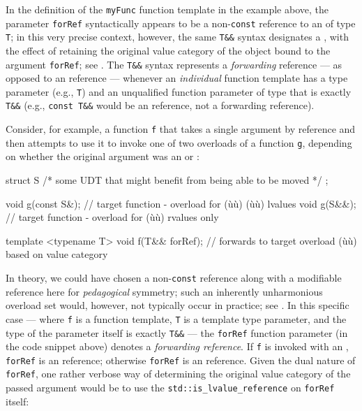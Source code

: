 \noindent In the definition of the \lstinline!myFunc! function template in the example above, the
parameter \lstinline!forRef! syntactically appears to be a
non-\lstinline!const! reference to an  of type \lstinline!T!; in
this very precise context, however, the same \lstinline!T&&! syntax
designates a , with the effect of retaining
the original value category of the object bound to the argument
\lstinline!forRef!; see . 
The \lstinline!T&&! syntax
represents a \emph{forwarding} reference --- as opposed to an
 reference --- whenever an \emph{individual} function template has a type parameter (e.g., \lstinline!T!) and
an unqualified function parameter of type that is exactly
\lstinline!T&&! (e.g., \lstinline!const!~\lstinline!T&&! would be an
 reference, not a forwarding reference).

Consider, for example, a function \lstinline!f! that takes a single
argument by reference and then attempts to use it to invoke one of two
overloads of a function \lstinline!g!, depending on whether the original
argument was an  or :

\begin{emcppslisting}[emcppsbatch=e1]
struct S { /* some UDT that might benefit from being able to be moved */ };

void g(const S&);  // target function - overload for (ù{}ù) (ù{}ù) lvalues
void g(S&&);       // target function - overload for (ù{}ù) rvalues only

template <typename T>
void f(T&& forRef); // forwards to target overload (ù{}ù) based on value category
\end{emcppslisting}

\noindent In
theory, we could have chosen a non-\lstinline!const! 
reference along with a modifiable  reference here for
\emph{pedagogical} symmetry; such an inherently unharmonious overload
set would, however, not typically occur in practice; see .
In this specific case --- where \lstinline!f! is a function template,
\lstinline!T! is a template type parameter, and the type of the parameter
itself is exactly \lstinline!T&&! --- the \lstinline!forRef! function
parameter (in the code snippet above) denotes a \emph{forwarding reference}. If \lstinline!f!\label{f-invoked-example}
is invoked with an , \lstinline!forRef! is an 
reference; otherwise \lstinline!forRef! is an  reference.
Given the dual nature of \lstinline!forRef!, one rather verbose way of
determining the original value category of the passed argument would be
to use the \lstinline!std::is_lvalue_reference!  on
\lstinline!forRef! itself:

